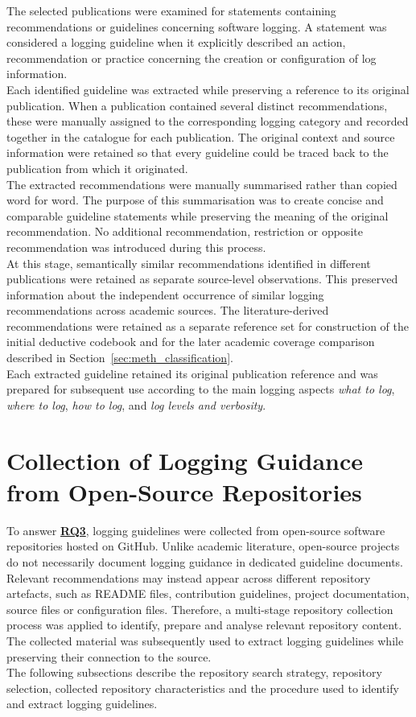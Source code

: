 The selected publications were examined for statements containing recommendations
or guidelines concerning software logging. A statement was considered a logging
guideline when it explicitly described an action, recommendation or practice
concerning the creation or configuration of log information.
\\
Each identified guideline was extracted while preserving a reference to its original
publication. When a publication contained several distinct recommendations, these were
manually assigned to the corresponding logging category and recorded together in the catalogue for each publication.
The original context and source information were retained so that every guideline could be traced back to the
publication from which it originated.
\\
The extracted recommendations were manually summarised rather than copied word for
word. The purpose of this summarisation was to create concise and comparable guideline
statements while preserving the meaning of the original recommendation. No additional
recommendation, restriction or opposite recommendation was introduced during this
process.
\\
At this stage, semantically similar recommendations identified in different
publications were retained as separate source-level observations. This preserved
information about the independent occurrence of similar logging recommendations
across academic sources. The literature-derived recommendations were retained as a
separate reference set for construction of the initial deductive codebook and for the
later academic coverage comparison described in
Section~\ref{sec:meth_classification}.
\\
Each extracted guideline retained its original publication reference and was prepared
for subsequent use according to the main logging aspects
\textit{what to log}, \textit{where to log}, \textit{how to log}, and
\textit{log levels and verbosity}.

\section{Collection of Logging Guidance from Open-Source Repositories}  \label{sec:meth_collection_opensource}

To answer \hyperref[table:t1rq]{\textbf{RQ3}}, logging guidelines were collected from open-source software repositories hosted on GitHub.
Unlike academic literature, open-source projects do not necessarily document logging guidance in dedicated guideline documents.
Relevant recommendations may instead appear across different repository artefacts, such as README files, contribution guidelines,
project documentation, source files or configuration files.
Therefore, a multi-stage repository collection process was applied to identify, prepare and analyse relevant repository content.
The collected material was subsequently used to extract logging guidelines while preserving their connection to the source.
\\
The following subsections describe the repository search strategy, repository selection, collected repository characteristics
and the procedure used to identify and extract logging guidelines.

